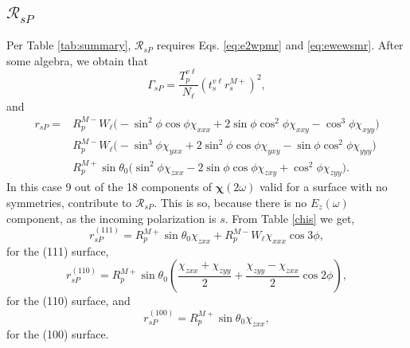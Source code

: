 

\subsection{\texorpdfstring{$\mathcal{R}_{sP}$}{RsP}}\label{sec:RsP}

Per Table \ref{tab:summary}, $\mathcal{R}_{sP}$ requires Eqs. \eqref{eq:e2wpmr}
and \eqref{eq:ewewsmr}. After some algebra, we obtain that
\begin{equation}\label{mcv4}
\Gamma_{sP}=
\frac{T^{v\ell}_{p}}{N_{\ell}}
\left(t^{v\ell}_{s}r^{M+}_{s}\right)^{2},
\end{equation}
and
\begin{equation}
\begin{split}
r_{sP} = 
& R^{M-}_{p}W_{\ell}
\big(
- \sin^{2}\phi\cos\phi\chi_{xxx}
+ 2\sin\phi\cos^{2}\phi\chi_{xxy}
- \cos^{3}\phi\chi_{xyy}
\big)\\
& R^{M-}_{p}W_{\ell}
\big(
- \sin^{3}\phi\chi_{yxx}
+ 2\sin^{2}\phi\cos\phi\chi_{yxy}
- \sin\phi\cos^{2}\phi\chi_{yyy}
\big)\\
& R^{M+}_{p}\sin\theta_{0}
\big(
  \sin^{2}\phi\chi_{zxx}
- 2\sin\phi\cos\phi\chi_{zxy}
+ \cos^{2}\phi\chi_{zyy}
\big).
\end{split}
\end{equation}
In this case 9 out of the 18 components of $\boldsymbol{\chi}(2\omega)$ valid
for a surface with no symmetries, contribute to $\mathcal{R}_{sP}$. This is so,
because there is no $E_z(\omega)$ component, as the incoming polarization is
$s$. From Table \ref{chis} we get,
\begin{equation}
r^{(111)}_{sP} = 
R^{M+}_{p}\sin\theta_{0}\chi_{zxx} +
R^{M-}_{p}W_{\ell}\chi_{xxx}\cos3\phi,
\end{equation}
for the (111) surface,
\begin{equation}
r^{(110)}_{sP} = 
R^{M+}_{p}\sin\theta_{0}
\left(
\frac{\chi_{zxx} + \chi_{zyy}}{2} + \frac{\chi_{zyy} - \chi_{zxx}}{2}\cos2\phi
\right),
\end{equation}
for the (110) surface, and
\begin{equation}
r^{(100)}_{sP} = R^{M+}_{p}\sin\theta_{0}\chi_{zxx},
\end{equation}
for the (100) surface.



